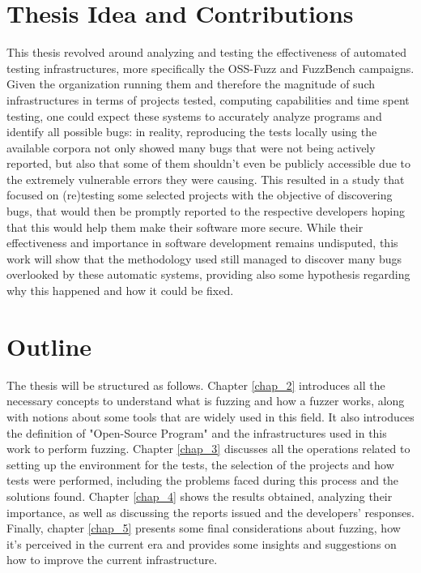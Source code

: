 \section{Thesis Idea and Contributions}
This thesis revolved around analyzing and testing the effectiveness of automated testing infrastructures, more specifically the OSS-Fuzz and FuzzBench campaigns.
\newline
Given the organization running them and therefore the magnitude of such infrastructures in terms of projects tested, computing capabilities and time spent testing, one could expect these systems to accurately analyze programs and identify all possible bugs: in reality, reproducing the tests locally using the available corpora not only showed many bugs that were not being actively reported, but also that some of them shouldn't even be publicly accessible due to the extremely vulnerable errors they were causing.
\newline
This resulted in a study that focused on (re)testing some selected projects with the objective of discovering bugs, that would then be promptly reported to the respective developers hoping that this would help them make their software more secure. 
\newline
While their effectiveness and importance in software development remains undisputed, this work will show that the methodology used still managed to discover many bugs overlooked by these automatic systems, providing also some hypothesis regarding why this happened and how it could be fixed.




\newpage
\section{Outline}
The thesis will be structured as follows.
\newline
Chapter \ref{chap_2} introduces all the necessary concepts to understand what is fuzzing and how a fuzzer works, along with notions about some tools that are widely used in this field. It also introduces the definition of "Open-Source Program" and the infrastructures used in this work to perform fuzzing.
\newline
Chapter \ref{chap_3} discusses all the operations related to setting up the environment for the tests, the selection of the projects and how tests were performed, including the problems faced during this process and the solutions found.
\newline
Chapter \ref{chap_4} shows the results obtained, analyzing their importance, as well as discussing the reports issued and the developers' responses.
\newline
Finally, chapter \ref{chap_5} presents some final considerations about fuzzing, how it's perceived in the current era and provides some insights and suggestions on how to improve the current infrastructure.
\newline \newline \newline
{}